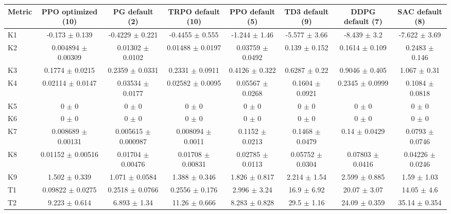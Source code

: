 \begin{tabular}{lccccccc}
\toprule
Metric & PPO optimized (10) & PG default (2) & TRPO default (10) & PPO default (5) & TD3 default (9) & DDPG default (7) & SAC default (8) \\
\midrule
K1 & -0.173 $\pm$ 0.139 & -0.4229 $\pm$ 0.221 & -0.4455 $\pm$ 0.555 & -1.244 $\pm$ 1.46 & -5.577 $\pm$ 3.66 & -8.439 $\pm$ 3.2 & -7.622 $\pm$ 3.69 \\
K2 & 0.004894 $\pm$ 0.00309 & 0.01302 $\pm$ 0.0102 & 0.01488 $\pm$ 0.0197 & 0.03759 $\pm$ 0.0492 & 0.139 $\pm$ 0.152 & 0.1614 $\pm$ 0.109 & 0.2483 $\pm$ 0.146 \\
K3 & 0.1774 $\pm$ 0.0215 & 0.2359 $\pm$ 0.0331 & 0.2331 $\pm$ 0.0911 & 0.4126 $\pm$ 0.322 & 0.6287 $\pm$ 0.22 & 0.9046 $\pm$ 0.405 & 1.067 $\pm$ 0.31 \\
K4 & 0.02114 $\pm$ 0.0147 & 0.03534 $\pm$ 0.0177 & 0.02582 $\pm$ 0.0095 & 0.05567 $\pm$ 0.0268 & 0.1604 $\pm$ 0.0921 & 0.2345 $\pm$ 0.0999 & 0.1084 $\pm$ 0.0818 \\
K5 & 0 $\pm$ 0 & 0 $\pm$ 0 & 0 $\pm$ 0 & 0 $\pm$ 0 & 0 $\pm$ 0 & 0 $\pm$ 0 & 0 $\pm$ 0 \\
K6 & 0 $\pm$ 0 & 0 $\pm$ 0 & 0 $\pm$ 0 & 0 $\pm$ 0 & 0 $\pm$ 0 & 0 $\pm$ 0 & 0 $\pm$ 0 \\
K7 & 0.008689 $\pm$ 0.00131 & 0.005615 $\pm$ 0.000987 & 0.008094 $\pm$ 0.0011 & 0.1152 $\pm$ 0.0213 & 0.1468 $\pm$ 0.0479 & 0.14 $\pm$ 0.0429 & 0.0793 $\pm$ 0.0746 \\
K8 & 0.01152 $\pm$ 0.00516 & 0.01704 $\pm$ 0.00476 & 0.01708 $\pm$ 0.00831 & 0.02785 $\pm$ 0.0113 & 0.05752 $\pm$ 0.0304 & 0.07803 $\pm$ 0.0416 & 0.04226 $\pm$ 0.0246 \\
K9 & 1.502 $\pm$ 0.339 & 1.071 $\pm$ 0.0584 & 1.388 $\pm$ 0.346 & 1.826 $\pm$ 0.817 & 2.214 $\pm$ 1.54 & 2.599 $\pm$ 0.885 & 1.59 $\pm$ 1.03 \\
T1 & 0.09822 $\pm$ 0.0275 & 0.2518 $\pm$ 0.0766 & 0.2556 $\pm$ 0.176 & 2.996 $\pm$ 3.24 & 16.9 $\pm$ 6.92 & 20.07 $\pm$ 3.07 & 14.05 $\pm$ 4.6 \\
T2 & 9.223 $\pm$ 0.614 & 6.893 $\pm$ 1.34 & 11.26 $\pm$ 0.666 & 8.283 $\pm$ 0.828 & 29.5 $\pm$ 1.16 & 24.09 $\pm$ 0.359 & 35.14 $\pm$ 0.354 \\
\bottomrule
\end{tabular}
